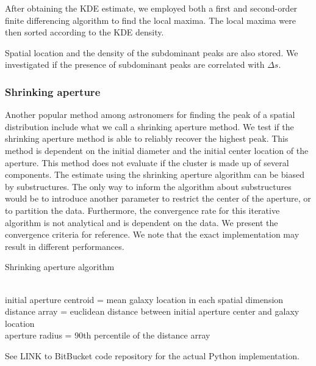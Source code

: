 After obtaining the KDE estimate, we employed both a first and second-order  
finite differencing algorithm to find the local maxima.  
The local maxima were then sorted according to the KDE density.  



Spatial location and the density of the subdominant peaks are also stored.
We investigated if the presence of subdominant peaks are correlated with
$\Delta s$. 

\subsubsection{Shrinking aperture}
Another popular method among astronomers for finding the peak of a spatial
distribution include what we call a shrinking aperture method.
We test if the shrinking aperture method is able to reliably recover the highest 
peak.
This method is dependent on the initial diameter and the initial center 
location of the aperture.
This method does not evaluate if the cluster is made up of
several components.
The estimate using the shrinking aperture algorithm can be biased by
substructures. The only way to inform the algorithm about substructures would
be to introduce another parameter to restrict the center of the aperture, or to
partition the data.
Furthermore, the convergence rate for this iterative algorithm is not
analytical and is dependent on the data. We present the
convergence criteria for reference. 
We note that the exact implementation may result in different performances.
\begin{algorithm}
	\caption{Shrinking aperture algorithm}
	 \hrulefill \\

	 initial aperture centroid = mean galaxy location in each spatial dimension\\
 	distance array = euclidean distance between initial aperture center and galaxy
	location \\
 	aperture radius = 90th percentile of the distance array\\ 
	   \hrulefill
 \end{algorithm}
 See LINK to BitBucket code repository for the actual Python implementation.


